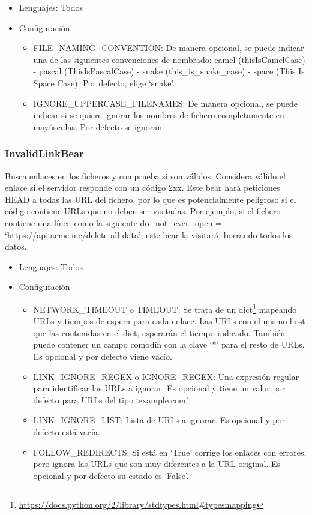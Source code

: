\documentclass[a4paper, 12pt]{book}
\begin{document}
\begin{itemize}
  \item Lenguajes: Todos
  \item Configuración
    \begin{itemize}
          \item FILE\_NAMING\_CONVENTION: De manera opcional, se puede indicar una de las siguientes convenciones de nombrado: camel (thisIsCamelCase) - pascal (ThisIsPascalCase) - snake (this\_is\_snake\_case) - space (This Is Space Case). Por defecto, elige `snake'.
          \item IGNORE\_UPPERCASE\_FILENAMES: De manera opcional, se puede indicar si se quiere ignorar los nombres de fichero completamente en mayúsculas. Por defecto se ignoran.
    \end{itemize}
\end{itemize}

\subsubsection{InvalidLinkBear}
\label{sec:seccion1.2.3}
Busca enlaces en los ficheros y comprueba si son válidos. Considera válido el enlace si el servidor responde con un código 2xx. Este bear hará peticiones HEAD a todas las URL del fichero, por lo que es potencialmente peligroso si el código contiene URLs que no deben ser visitadas. Por ejemplo, si el fichero contiene una línea como la siguiente do\_not\_ever\_open = `https://api.acme.inc/delete-all-data', este bear la visitará, borrando todos los datos.

\begin{itemize}
  \item Lenguajes: Todos
  \item Configuración
    \begin{itemize}
          \item NETWORK\_TIMEOUT o TIMEOUT: Se trata de un dict\footnote{\url{https://docs.python.org/2/library/stdtypes.html#typesmapping}} mapeando URLs y tiempos de espera para cada enlace. Las URLs con el mismo host que las contenidas en el dict, esperarán el tiempo indicado. También puede contener un campo comodín con la clave ‘*’ para el resto de URLs. Es opcional y por defecto viene vacío.
          \item LINK\_IGNORE\_REGEX o IGNORE\_REGEX: Una expresión regular para identificar las URLs a ignorar. Es opcional y tiene un valor por defecto para URLs del tipo `example.com'.
          \item LINK\_IGNORE\_LIST: Lista de URLs a ignorar. Es opcional y por defecto está vacía.
          \item FOLLOW\_REDIRECTS: Si está en ‘True’ corrige los enlaces con errores, pero ignora las URLs que son muy diferentes a la URL original.  Es opcional y por defecto su estado es ‘False’.
    \end{itemize}
\end{itemize}
\end{document}
